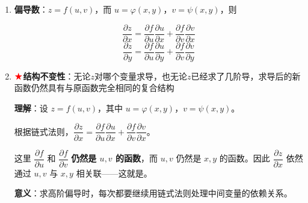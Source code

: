 \documentclass[../book.tex]{subfiles}
\begin{document}
\begin{enumerate}
        \item \textbf{偏导数}：$z = f(u,v)$，而 $u = \varphi(x,y)$，$v = \psi(x,y)$，则
        \begin{center}
            \begin{minipage}{0.5\textwidth}
                \[
                    \frac{\partial z}{\partial x} = \frac{\partial f}{\partial u}\frac{\partial u}{\partial x} + \frac{\partial f}{\partial v}\frac{\partial v}{\partial x}
                \]
                \[
                    \frac{\partial z}{\partial y} = \frac{\partial f}{\partial u}\frac{\partial u}{\partial y} + \frac{\partial f}{\partial v}\frac{\partial v}{\partial y}
                \]
            \end{minipage}%
            \begin{minipage}{0.4\textwidth}
                \centering
            \end{minipage}
        \end{center}
        \item $\color{red}{\bigstar}$\textbf{结构不变性}：无论$z$对哪个变量求导，也无论$z$已经求了几阶导，求导后的新函数仍然具有与原函数完全相同的复合结构

        \textbf{理解}：设 $z = f(u,v)$，其中 $u = \varphi(x,y)$，$v = \psi(x,y)$。

        根据链式法则，$\dfrac{\partial z}{\partial x} = \dfrac{\partial f}{\partial u}\dfrac{\partial u}{\partial x} + \dfrac{\partial f}{\partial v}\dfrac{\partial v}{\partial x}$。

        这里 $\dfrac{\partial f}{\partial u}$ 和 $\dfrac{\partial f}{\partial v}$ \textbf{仍然是 $u, v$ 的函数}，而 $u, v$ 仍然是 $x, y$ 的函数。因此 $\dfrac{\partial z}{\partial x}$ 依然通过 $u, v$ 与 $x, y$ 相关联——这就是{}。

        \textbf{意义}：求高阶偏导时，每次都要继续用链式法则处理中间变量的依赖关系。


\end{enumerate}
\end{document}

